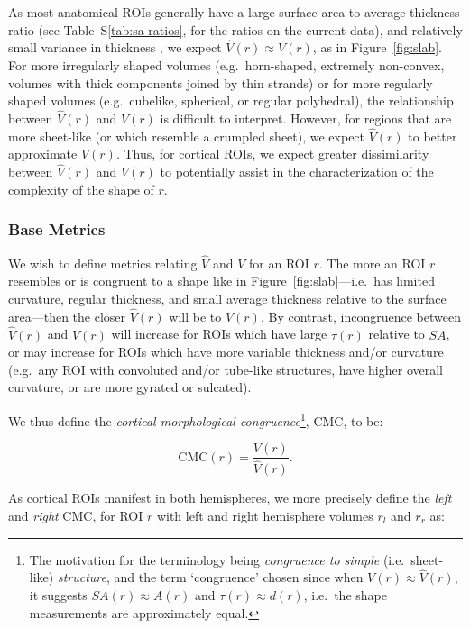 \documentclass{article}
\begin{document}
As most anatomical ROIs generally have a large surface area to average
thickness ratio (see Table~S\ref{tab:sa-ratios}, for the ratios on the
current data), and relatively small variance in thickness
\citep{imBrainSizeCortical2008}, we expect \(\hat{V}(r) \approx V(r)\), as in
Figure~\ref{fig:slab}. For more irregularly shaped volumes (e.g.\
horn-shaped, extremely non-convex, volumes with thick components joined by
thin strands) or for more regularly shaped volumes (e.g.\ cubelike,
spherical, or regular polyhedral), the relationship between \(\hat{V}(r)\)
and \(V(r)\) is difficult to interpret. However, for regions that are more
sheet-like (or which resemble a crumpled sheet), we expect \(\hat{V}(r)\) to
better approximate \(V(r)\). Thus, for cortical ROIs, we expect greater
dissimilarity between \(\hat{V}(r)\) and \(V(r)\) to potentially assist in
the characterization of the complexity of the shape of \(r\).


\subsubsection{Base Metrics}

We wish to define metrics relating \(\hat{V}\) and \(V\) for an ROI  \(r\).
The more an ROI \(r\) resembles or is congruent to a shape like in
Figure~\ref{fig:slab}---i.e.\ has limited curvature, regular thickness, and
small average thickness relative to the surface area---then the closer
\(\hat{V}(r)\) will be to \(V(r)\). By contrast, incongruence between
\(\hat{V}(r)\) and \(V(r)\) will increase for ROIs which
have large \(\tau(r)\) relative to \(SA\), or may increase for ROIs
which have more variable thickness and/or curvature (e.g.\ any ROI with
convoluted and/or tube-like structures, have higher overall curvature, or are
more gyrated or sulcated).

We thus define the \emph{cortical morphological congruence}\footnote{The
motivation for the terminology being \emph{congruence to simple} (i.e.\
sheet-like) \emph{structure}, and the term `congruence' chosen since when
\(V(r) \approx \hat{V}(r)\), it suggests \(SA(r) \approx A(r)\) and \(\tau(r)
\approx d(r)\), i.e.\ the shape measurements are approximately equal.}, CMC,
to be:

\begin{equation}
\text{CMC}(r) = \frac{V(r)}{\hat{V}(r)}.
\end{equation}

As cortical ROIs manifest in both hemispheres, we more precisely define the \emph{left}
and \emph{right} CMC, for ROI \(r\) with left and right
hemisphere volumes \(r_l\) and \(r_r\) as:
\end{document}
